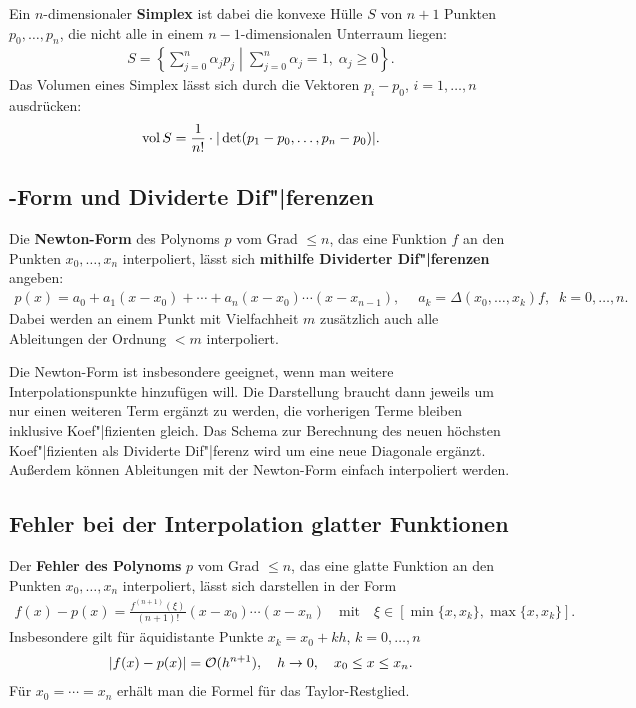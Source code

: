 \linie

Ein $n$-dimensionaler \textbf{Simplex} ist dabei die konvexe Hülle $S$ von
$n + 1$ Punkten $p_0, \dotsc, p_n$, die nicht alle in einem
$n - 1$-dimensionalen Unterraum liegen:
\begin{align*}
    S = \left\{\left.\sum_{j=0}^n \alpha_j p_j \;\right|\;
    \sum_{j=0}^n \alpha_j = 1,\; \alpha_j \ge 0\right\}.
\end{align*}
Das Volumen eines Simplex lässt sich durch die Vektoren $p_i - p_0$,
$i = 1, \dotsc, n$ ausdrücken:
\begin{align*}
    \operatorname{vol} S = \frac{1}{n!} \cdot |\det(p_1 - p_0, \dotsc, p_n - p_0)|.
\end{align*}

\subsection{%
    -Form und Dividerte Dif"|ferenzen%
}

Die \textbf{Newton-Form} des Polynoms $p$ vom Grad $\le n$, das eine Funktion
$f$ an den Punkten $x_0, \dotsc, x_n$ interpoliert, lässt sich
\textbf{mithilfe Dividerter Dif"|ferenzen} angeben:
\begin{align*}
    p(x) = a_0 + a_1 (x - x_0) + \dotsb + a_n (x - x_0) \dotsm (x - x_{n-1}),
    \quad\; a_k = \Delta(x_0, \dotsc, x_k)f,\;\; k = 0, \dotsc, n.
\end{align*}
Dabei werden an einem Punkt mit Vielfachheit $m$ zusätzlich auch alle
Ableitungen der Ordnung $< m$ interpoliert.

Die Newton-Form ist insbesondere geeignet, wenn man weitere
Interpolationspunkte hinzufügen will.
Die Darstellung braucht dann jeweils um nur einen weiteren Term ergänzt zu
werden, die vorherigen Terme bleiben inklusive Koef"|fizienten gleich.
Das Schema zur Berechnung des neuen höchsten Koef"|fizienten als
Dividerte Dif"|ferenz wird um eine neue Diagonale ergänzt. \\
Außerdem können Ableitungen mit der Newton-Form einfach interpoliert werden.

\subsection{%
    Fehler bei der Interpolation glatter Funktionen%
}

Der \textbf{Fehler des Polynoms} $p$ vom Grad $\le n$,
das eine glatte Funktion an den
Punkten $x_0, \dotsc, x_n$ interpoliert, lässt sich darstellen in der Form
\begin{align*}
    f(x) - p(x) = \frac{f^{(n+1)}(\xi)}{(n + 1)!} (x - x_0) \dotsm (x - x_n)
    \quad\text{mit}\quad \xi \in \left[\min\{x, x_k\},
    \max\{x, x_k\}\right].
\end{align*}
Insbesondere gilt für äquidistante Punkte $x_k = x_0 + kh$, $k = 0, \dotsc, n$
\begin{align*}
    |f(x) - p(x)| = \mathcal{O}(h^{n+1}),\quad h \to 0, \quad x_0 \le x \le x_n.
\end{align*}
Für $x_0 = \dotsb = x_n$ erhält man die Formel für das Taylor-Restglied.

